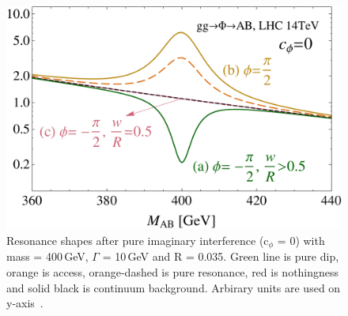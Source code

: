 \begin{figure}[htp]
\centering
\includegraphics[scale=0.5]{fig/sm_beyond/dip_peak_nothing.pdf}
\caption{Resonance shapes after pure imaginary interference (c$_{\phi}$ = 0) with mass = 400\,GeV, $\Gamma$ = 10\,GeV and R = 0.035. Green line is pure dip, orange is access, orange-dashed is pure resonance, red is nothingness and solid black is continuum background. Arbirary units are used on y-axis~\cite{Jung:2015gta}. }\label{fig:dip_peak_nothing_H_A}
\end{figure}

